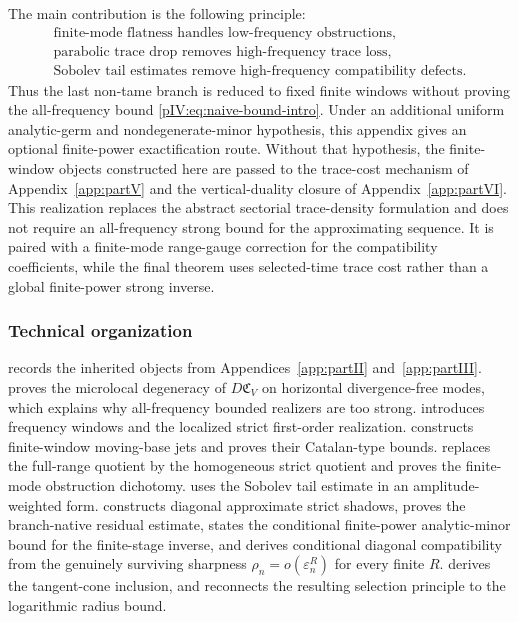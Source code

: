 \documentclass[11pt]{article}
\numberwithin{equation}{section}
\theoremstyle{plain}
\theoremstyle{definition}
\theoremstyle{remark}
\newcommand{\calC}{\mathfrak C}
\begin{document}
The main contribution is the following principle:
\[
\boxed{
\begin{gathered}
\text{finite-mode flatness handles low-frequency obstructions,}\\
\text{parabolic trace drop removes high-frequency trace loss,}\\
\text{Sobolev tail estimates remove high-frequency compatibility defects.}
\end{gathered}}
\]
Thus the last non-tame branch is reduced to fixed finite windows without proving the all-frequency bound
\eqref{pIV:eq:naive-bound-intro}.  Under an additional uniform analytic-germ and nondegenerate-minor hypothesis, this appendix gives an optional finite-power exactification route.  Without that hypothesis, the finite-window objects constructed here are passed to the trace-cost mechanism of Appendix~\ref{app:partV} and the vertical-duality closure of Appendix~\ref{app:partVI}.  This realization replaces the abstract sectorial trace-density formulation and does not require an all-frequency strong bound for the approximating sequence.  It is paired with a finite-mode range-gauge correction for the compatibility coefficients, while the final theorem uses selected-time trace cost rather than a global finite-power strong inverse.

\subsubsection{Technical organization}

 records the inherited objects from Appendices~\ref{app:partII} and~\ref{app:partIII}.  
proves the microlocal degeneracy of \(D\calC_V\) on horizontal divergence-free modes,
which explains why all-frequency bounded realizers are too strong.  
introduces frequency windows and the localized strict first-order realization.
 constructs finite-window moving-base jets and proves their
Catalan-type bounds.   replaces the full-range quotient by
the homogeneous strict quotient and proves the finite-mode obstruction dichotomy.
 uses the Sobolev tail estimate in an amplitude-weighted form.
 constructs diagonal approximate strict shadows, proves the
branch-native residual estimate, states the conditional finite-power analytic-minor bound for the
finite-stage inverse, and derives conditional diagonal compatibility from the genuinely
surviving sharpness \(\rho_n=o(\varepsilon_n^R)\) for every finite \(R\).
 derives the tangent-cone inclusion, and 
reconnects the resulting selection principle to the logarithmic radius bound.
\end{document}
